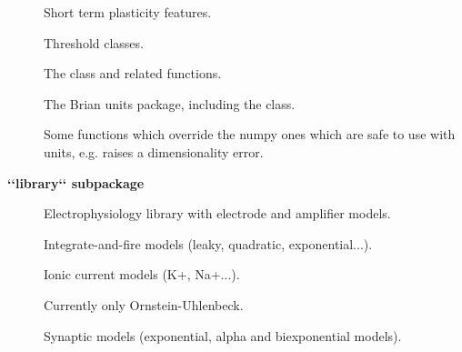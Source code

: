 \documentclass[letterpaper,10pt,english]{manual}
\begin{document}
\begin{description}
\item[] \leavevmode
Short term plasticity features.

\item[] \leavevmode
Threshold classes.

\item[] \leavevmode
The  class and related functions.

\item[] \leavevmode
The Brian units package, including the  class.

\item[] \leavevmode
Some functions which override the numpy ones which are safe to use with
units, e.g.  raises a dimensionality error.

\end{description}

\textbf{{}`{}`library{}`{}` subpackage}
\begin{description}
\item[] \leavevmode
Electrophysiology library with electrode and amplifier models.

\item[] \leavevmode
Integrate-and-fire models (leaky, quadratic, exponential...).

\item[] \leavevmode
Ionic current models (K+, Na+...).

\item[] \leavevmode
Currently only Ornstein-Uhlenbeck.

\item[] \leavevmode
Synaptic models (exponential, alpha and biexponential models).

\end{description}
\end{document}
